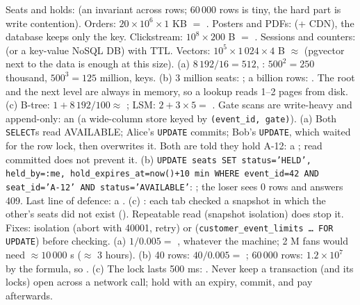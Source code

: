  Seats and holds:  (an invariant across rows; 60\,000 rows is tiny, the hard part is write contention). Orders: $20 \times 10^6 \times 1$ KB $=$ . Posters and PDFs:  (+ CDN), the database keeps only the key. Clickstream: $10^8 \times 200$ B $=$ . Sessions and counters:  (or a key-value NoSQL DB) with TTL. Vectors: $10^5 \times 1\,024 \times 4$ B $\approx$  (pgvector next to the data is enough at this size).
 (a) $8\,192/16 = 512$, : $500^2 = 250$ thousand, $500^3 = 125$ million,  keys. (b) 3 million seats: ; a billion rows: . The root and the next level are always in memory, so a lookup reads 1--2 pages from disk. (c) B-tree: $1 + 8\,192/100 \approx$ ; LSM: $2 + 3 \times 5 =$ . Gate scans are write-heavy and append-only: an  (a wide-column store keyed by \texttt{(event\_id, gate)}).
 (a) Both \texttt{SELECT}s read AVAILABLE; Alice's \texttt{UPDATE} commits; Bob's \texttt{UPDATE}, which waited for the row lock, then overwrites it. Both are told they hold A-12: a ; read committed does not prevent it. (b) \texttt{UPDATE seats SET status='HELD', held\_by=:me, hold\_expires\_at=now()+10 min WHERE event\_id=42 AND seat\_id='A-12' AND status='AVAILABLE'}: ; the loser sees 0 rows and answers 409. Last line of defence: a . (c) : each tab checked a snapshot in which the other's seats did not exist (). Repeatable read (snapshot isolation) does  stop it. Fixes:  isolation (abort with 40001, retry) or  (\texttt{customer\_event\_limits \dots\ FOR UPDATE}) before checking.
 (a) $1/0.005 =$ , whatever the machine; 2 M fans would need $\approx 10\,000$ s ($\approx$ 3 hours). (b) 40 rows: $40/0.005 =$ ; 60\,000 rows: $1.2 \times 10^7$ by the formula, so . (c) The lock lasts 500 ms: . Never keep a transaction (and its locks) open across a network call; hold with an expiry, commit, and pay afterwards.
